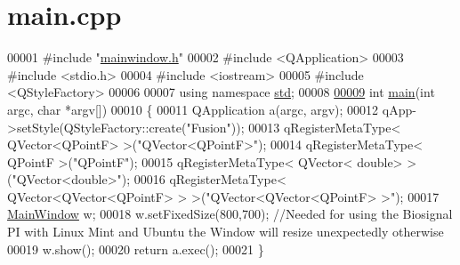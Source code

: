 \hypertarget{main_8cpp_source}{}\section{main.\+cpp}
\label{main_8cpp_source}

\begin{DoxyCode}
00001 \textcolor{preprocessor}{#include "\hyperlink{mainwindow_8h}{mainwindow.h}"}
00002 \textcolor{preprocessor}{#include <QApplication>}
00003 \textcolor{preprocessor}{#include <stdio.h>}
00004 \textcolor{preprocessor}{#include <iostream>}
00005 \textcolor{preprocessor}{#include <QStyleFactory>}
00006 
00007 \textcolor{keyword}{using namespace }\hyperlink{namespacestd}{std};
00008 
\hypertarget{main_8cpp_source.tex_l00009}{}\hyperlink{main_8cpp_a0ddf1224851353fc92bfbff6f499fa97}{00009} \textcolor{keywordtype}{int} \hyperlink{main_8cpp_a0ddf1224851353fc92bfbff6f499fa97}{main}(\textcolor{keywordtype}{int} argc, \textcolor{keywordtype}{char} *argv[])
00010 \{
00011     QApplication a(argc, argv);
00012     qApp->setStyle(QStyleFactory::create(\textcolor{stringliteral}{"Fusion"}));
00013     qRegisterMetaType< QVector<QPointF> >(\textcolor{stringliteral}{"QVector<QPointF>"});
00014     qRegisterMetaType< QPointF >(\textcolor{stringliteral}{"QPointF"});
00015     qRegisterMetaType< QVector< double> >(\textcolor{stringliteral}{"QVector<double>"});
00016     qRegisterMetaType< QVector<QVector<QPointF> > >(\textcolor{stringliteral}{"QVector<QVector<QPointF> >"});
00017     \hyperlink{classMainWindow}{MainWindow} w;
00018     w.setFixedSize(800,700);  \textcolor{comment}{//Needed for using the Biosignal PI with Linux Mint and Ubuntu the Window
       will resize unexpectedly otherwise}
00019     w.show();
00020     \textcolor{keywordflow}{return} a.exec();
00021 \}
\end{DoxyCode}
